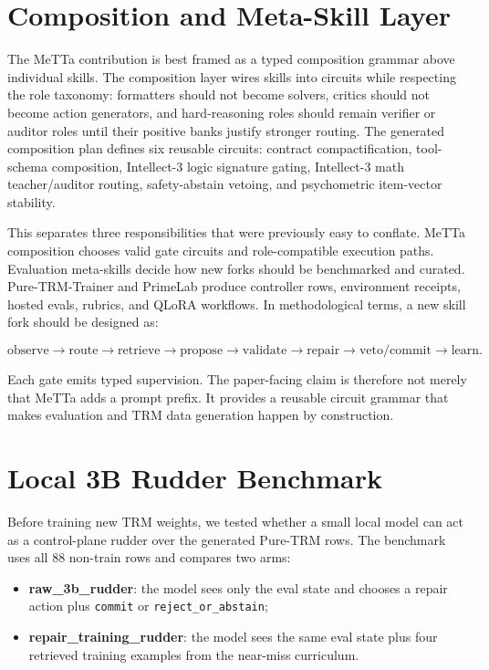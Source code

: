 \documentclass[11pt]{article}
\begin{document}
\section{Composition and Meta-Skill Layer}

The MeTTa contribution is best framed as a typed composition grammar above individual skills. The composition layer wires skills into circuits while respecting the role taxonomy: formatters should not become solvers, critics should not become action generators, and hard-reasoning roles should remain verifier or auditor roles until their positive banks justify stronger routing. The generated composition plan defines six reusable circuits: contract compactification, tool-schema composition, Intellect-3 logic signature gating, Intellect-3 math teacher/auditor routing, safety-abstain vetoing, and psychometric item-vector stability.

This separates three responsibilities that were previously easy to conflate. MeTTa composition chooses valid gate circuits and role-compatible execution paths. Evaluation meta-skills decide how new forks should be benchmarked and curated. Pure-TRM-Trainer and PrimeLab produce controller rows, environment receipts, hosted evals, rubrics, and QLoRA workflows. In methodological terms, a new skill fork should be designed as:

\[
\mathrm{observe} \rightarrow \mathrm{route} \rightarrow \mathrm{retrieve} \rightarrow \mathrm{propose} \rightarrow \mathrm{validate} \rightarrow \mathrm{repair} \rightarrow \mathrm{veto/commit} \rightarrow \mathrm{learn}.
\]

Each gate emits typed supervision. The paper-facing claim is therefore not merely that MeTTa adds a prompt prefix. It provides a reusable circuit grammar that makes evaluation and TRM data generation happen by construction.

\section{Local 3B Rudder Benchmark}

Before training new TRM weights, we tested whether a small local model can act as a control-plane rudder over the generated Pure-TRM rows. The benchmark uses all 88 non-train rows and compares two arms:

\begin{itemize}[leftmargin=*]
  \item \textbf{raw\_3b\_rudder}: the model sees only the eval state and chooses a repair action plus \texttt{commit} or \texttt{reject\_or\_abstain};
  \item \textbf{repair\_training\_rudder}: the model sees the same eval state plus four retrieved training examples from the near-miss curriculum.
\end{itemize}
\end{document}
